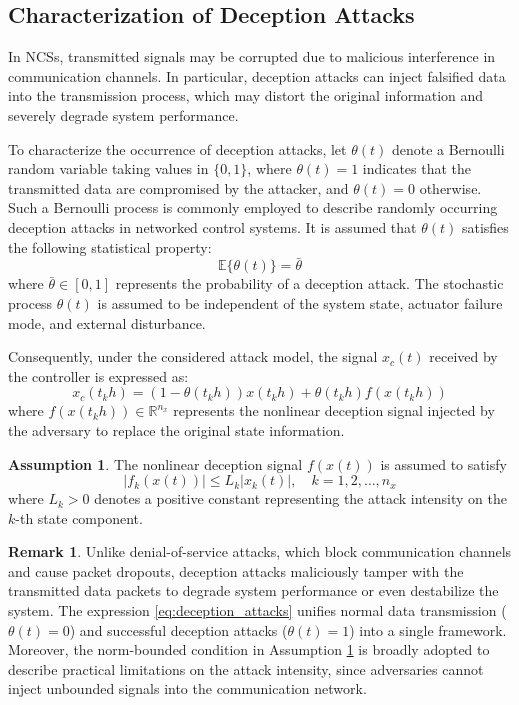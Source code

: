 \documentclass[preprint,review,fleqn,sort&compress,3p]{elsarticle}
\theoremstyle{definition} %
\theoremstyle{definition}%
\newtheorem{rem}{Remark}[section]
\newtheorem{asptn}{Assumption}[section]
\begin{document}
\subsection{Characterization of Deception Attacks}\label{sec2.3}
In NCSs, transmitted signals may be corrupted due to malicious interference in communication channels. In particular, deception attacks can inject falsified data into the transmission process, which may distort the original information and severely degrade system performance.

To characterize the occurrence of deception attacks, let $\theta(t)$ denote a Bernoulli random variable taking values in $\{0,1\}$, where $\theta(t)=1$ indicates that the transmitted data are compromised by the attacker, and $\theta(t) = 0$ otherwise. Such a Bernoulli process is commonly employed to describe randomly occurring deception attacks in networked control systems. It is assumed that $\theta(t)$ satisfies the following statistical property:
\begin{equation}
	\mathbb{E}\{\theta(t)\} = \bar{\theta} 
\end{equation}
where $\bar{\theta} \in [0,1]$ represents the probability of a deception attack.
The stochastic process $\theta(t)$ is assumed to be independent of the system state, actuator failure mode, and external disturbance.

Consequently, under the considered attack model, the signal $x_c(t)$ received by the controller is expressed as:
\begin{equation}\label{eq:deception_attacks}
	x_c(t_{k} h) = (1 - \theta(t_{k} h)) x(t_{k} h) + \theta(t_{k} h) f(x(t_{k} h))
\end{equation}
where $f(x(t_{k}h)) \in \mathbb{R}^{n_x}$ represents the nonlinear deception signal injected by the adversary to replace the original state information.

\begin{asptn} \label{assump:attack_bound}
The nonlinear deception signal $f(x(t))$ is assumed to satisfy
\begin{equation}
	|f_k(x(t))| \le L_k |x_k(t)|,\quad k = 1,2,\ldots,n_x
\end{equation}
where $L_k > 0$ denotes a positive constant representing the attack intensity on the $k$-th state component.
\end{asptn}
\begin{rem}
	Unlike denial-of-service attacks, which block communication channels
	and cause packet dropouts, deception attacks maliciously tamper with the transmitted data packets to
	degrade system performance or even destabilize the system. The expression \eqref{eq:deception_attacks} unifies normal data transmission ($\theta(t) = 0$) and successful deception attacks ($\theta(t) = 1$) into
	a single framework. Moreover, the norm-bounded condition in Assumption \ref{assump:attack_bound} is broadly adopted to
	describe practical limitations on the attack intensity, since adversaries cannot inject unbounded signals
	into the communication network.
\end{rem}
\end{document}
